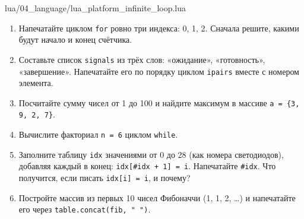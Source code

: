 \begin{codefile}{lua/04_language/lua_platform_infinite_loop.lua}
\end{codefile}

\begin{taskbox}
\begin{enumerate}
  \item Напечатайте циклом \verb|for| ровно три индекса: 0, 1, 2. Сначала решите, какими будут начало и конец счётчика.
  \item Составьте список \verb|signals| из трёх слов: «ожидание», «готовность», «завершение». Напечатайте его по порядку циклом \verb|ipairs| вместе с номером элемента.
  \item Посчитайте сумму чисел от 1 до 100 и найдите максимум в массиве \verb|a = {3, 9, 2, 7}|.
  \item Вычислите факториал \verb|n = 6| циклом \verb|while|.
  \item Заполните таблицу \verb|idx| значениями от 0 до 28 (как номера светодиодов), добавляя каждый в конец: \verb|idx[#idx + 1] = i|. Напечатайте \verb|#idx|. Что получится, если писать \verb|idx[i] = i|, и почему?
  \item Постройте массив из первых 10 чисел Фибоначчи (1, 1, 2, \dots) и напечатайте его через \verb|table.concat(fib, " ")|.
\end{enumerate}
\end{taskbox}
